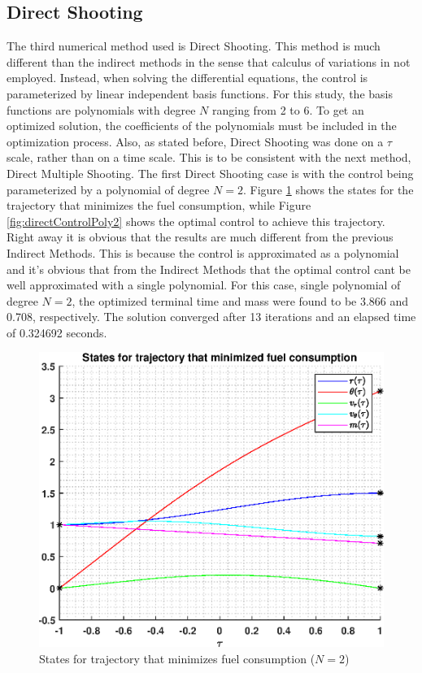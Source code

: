 \documentclass[]{article}
\begin{document}
\subsection{Direct Shooting}
The third numerical method used is Direct Shooting. This method is much different than the indirect methods in the sense that calculus of variations in not employed. Instead, when solving the differential equations, the control is parameterized by linear independent basis functions. For this study, the basis functions are polynomials with degree \(N\) ranging from 2 to 6. To get an optimized solution, the coefficients of the polynomials must be included in the optimization process. Also, as stated before, Direct Shooting was done on a \(\tau\) scale, rather than on a time scale. This is to be consistent with the next method, Direct Multiple Shooting.
\vspace{2mm}\newline 
The first Direct Shooting case is with the control being parameterized by a polynomial of degree \(N = 2\). Figure \ref{fig:directStatesPoly2} shows the states for the trajectory that minimizes the fuel consumption, while Figure \ref{fig:directControlPoly2} shows the optimal control to achieve this trajectory. Right away it is obvious that the results are much different from the previous Indirect Methods. This is because the control is approximated as a polynomial and it's obvious that from the Indirect Methods that the optimal control cant be well approximated with a single polynomial. For this case, single polynomial of degree \(N = 2\), the optimized terminal time and mass were found to be 3.866 and 0.708, respectively. The solution converged after 13 iterations and an elapsed time of 0.324692 seconds.
\begin{figure}
	\centering
	\includegraphics[scale=0.75]{directStatesPoly2.eps}
	\caption{States for trajectory that minimizes fuel consumption (\(N = 2\))}
	\label{fig:directStatesPoly2}
\end{figure}
\end{document}
